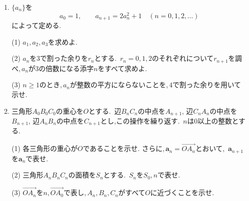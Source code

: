 \begin{enumerate}[label=\textbf{問\arabic*.},leftmargin=3.8em,format=\bookitemlink{practice-bridge}{problem}{answer}]
                ただし,\,$\displaystyle n\ge2$とする.
                \par\smallskip\noindent
                (3) $\displaystyle \alpha=\frac{1+\sqrt5}{2}$,\,$\displaystyle \beta=\frac{1-\sqrt5}{2}$とおく.
                を使って$\displaystyle c_n$を求めよ.
          \item {}$\displaystyle \{a_n\}$を
                \[
                  a_0=1,\qquad a_{n+1}=2a_n^2+1
                  \quad(n=0,1,2,\ldots)
                \]
                によって定める.
                \par\smallskip\noindent
                (1) $\displaystyle a_1,a_2,a_3$を求めよ.
                \par\smallskip\noindent
                (2) $\displaystyle a_n$を$\displaystyle 3$で割った余りを$\displaystyle r_n$とする.\,
                $\displaystyle r_n=0,1,2$のそれぞれについて$\displaystyle r_{n+1}$を調べ,\,$\displaystyle a_n$が$\displaystyle 3$の倍数になる添字$\displaystyle n$をすべて求めよ.
                \par\smallskip\noindent
                (3) $\displaystyle n\ge1$のとき,\,$\displaystyle a_n$が整数の平方にならないことを,\,$\displaystyle 4$で割った余りを用いて示せ.
          \item 三角形$\displaystyle A_0B_0C_0$の重心を$\displaystyle O$とする.\,
                辺$\displaystyle B_nC_n$の中点を$\displaystyle A_{n+1}$,
                辺$\displaystyle C_nA_n$の中点を$\displaystyle B_{n+1}$,
                辺$\displaystyle A_nB_n$の中点を$\displaystyle C_{n+1}$とし,この操作を繰り返す.\,
                $\displaystyle n$は$\displaystyle 0$以上の整数とする.
                \par\smallskip\noindent
                (1) 各三角形の重心が$\displaystyle O$であることを示せ.
                さらに,\,$\displaystyle \boldsymbol a_n=\overrightarrow{OA_n}$とおいて,\,
                $\displaystyle \boldsymbol a_{n+1}$を$\displaystyle \boldsymbol a_n$で表せ.
                \par\smallskip\noindent
                (2) 三角形$\displaystyle A_nB_nC_n$の面積を$\displaystyle S_n$とする.\,
                $\displaystyle S_n$を$\displaystyle S_0,n$で表せ.
                \par\smallskip\noindent
                (3) $\displaystyle \overrightarrow{OA_n}$を$\displaystyle n,\overrightarrow{OA_0}$で表し,\,$\displaystyle A_n,B_n,C_n$がすべて$\displaystyle O$に近づくことを示せ.

\end{enumerate}

